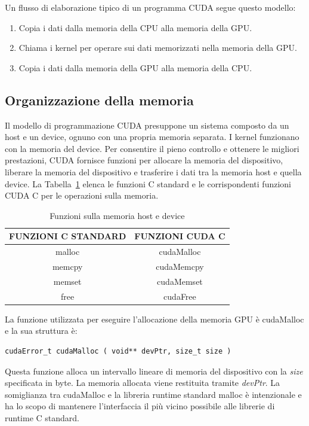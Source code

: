 Un flusso di elaborazione tipico di un programma CUDA segue questo modello:
\begin{enumerate}
	\item Copia i dati dalla memoria della CPU alla memoria della GPU.
	\item Chiama i kernel per operare sui dati memorizzati nella memoria della GPU.
	\item Copia i dati dalla memoria della GPU alla memoria della CPU.
\end{enumerate}
\subsection{Organizzazione della memoria}
\label{sec:managing_memory}
Il modello di programmazione CUDA presuppone un sistema composto da un host e un device, ognuno con una propria memoria separata. I kernel funzionano con la memoria del device. Per consentire il pieno controllo e ottenere le migliori prestazioni, CUDA fornisce funzioni per allocare la memoria del dispositivo, liberare la memoria del dispositivo e trasferire i dati tra la memoria host e quella device. La Tabella~\ref{table:Host and Device Memory Functions} elenca le funzioni C standard e le corrispondenti funzioni CUDA C per le operazioni sulla memoria.
\begin{table}[h!]
	\centering
	\begin{tabular}{c c} 
		\hline
		FUNZIONI C STANDARD & FUNZIONI CUDA C\\
		\hline
		malloc & cudaMalloc\\
		\hline
		memcpy & cudaMemcpy\\
		\hline
		memset & cudaMemset\\
		\hline
		free & cudaFree\\
		\hline
	\end{tabular}
	\caption{Funzioni sulla memoria host e device}
	\label{table:Host and Device Memory Functions}
\end{table}
La funzione utilizzata per eseguire l'allocazione della memoria GPU è cudaMalloc e la sua struttura è:
\begin{lstlisting}[label=code:cudaMalloc_def]
cudaError_t cudaMalloc ( void** devPtr, size_t size )
\end{lstlisting}
Questa funzione alloca un intervallo lineare di memoria del dispositivo con la \emph{size} specificata in byte. La memoria allocata viene restituita tramite \emph{devPtr}. La somiglianza tra cudaMalloc e la libreria runtime standard malloc è intenzionale e ha lo scopo di mantenere l'interfaccia il più vicino possibile alle librerie di runtime C standard.

